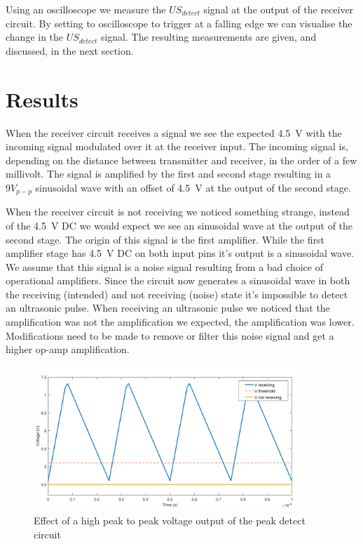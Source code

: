 Using an oscilloscope we measure the $US_{detect}$ signal at the output of the receiver circuit.
By setting to oscilloscope to trigger at a falling edge we can visualise the change in the $US_{detect}$ signal.
The resulting measurements are given, and discussed, in the next section.

\section{Results}

When the receiver circuit receives a signal we see the expected \SI{4.5}{\volt} with the incoming signal modulated over it at the receiver input.
The incoming signal is, depending on the distance between transmitter and receiver, in the order of a few millivolt.
The signal is amplified by the first and second stage resulting in a $9V_{p-p}$ sinusoidal wave with an offset of \SI{4.5}{\volt} at the output of the second stage.

When the receiver circuit is not receiving we noticed something strange, instead of the \SI{4.5}{\volt} DC we would expect we see an sinusoidal wave at the output of the second stage.
The origin of this signal is the first amplifier.
While the first amplifier stage has \SI{4.5}{\volt} DC on both input pins it's output is a sinusoidal wave.
We assume that this signal is a noise signal resulting from a bad choice of operational amplifiers.
Since the circuit now generates a sinusoidal wave in both the receiving (intended) and not receiving (noise) state it's impossible to detect an ultrasonic pulse. When receiving an ultrasonic pulse we noticed that the amplification was not the amplification we expected, the amplification was lower.
Modifications need to be made to remove or filter this noise signal and get a higher op-amp amplification.


\begin{figure}[H]
\centering
\includegraphics[width=0.9\textwidth]{Figures/waves_peak_detect_test.png}
\caption{Effect of a high peak to peak voltage output of the peak detect circuit}
\label{fig:waves_peak_test}
\end{figure}

